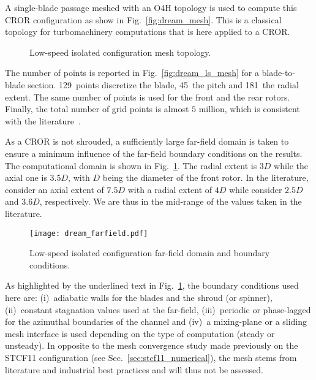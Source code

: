 
A single-blade passage meshed
with an O4H topology is used to compute this
CROR configuration as show in Fig.~\ref{fig:dream_mesh}. This is a classical
topology for turbomachinery computations that is here applied to 
a CROR.
\begin{figure}[htp]
  \centering
  \caption{Low-speed isolated configuration mesh topology.}
\end{figure}
The number of points is reported in 
Fig.~\ref{fig:dream_ls_mesh} for a blade-to-blade section. 
129~points discretize the blade, 45~the pitch and 181~the radial
extent. The same number of points is used for the front
and the rear rotors. 
Finally, the total number of grid points is almost $5$ million, which
is consistent with the literature~\cite{Stuermer2008,Bechet2011,
Francois2013,Zachariadis2011,Peters2012}.

As a CROR is not shrouded, a sufficiently large
far-field domain is taken to ensure a minimum influence
of the far-field boundary conditions on the results.
The computational domain is shown in Fig.~\ref{fig:dream_farfield}.
The radial extent is $3D$ while the axial one is $3.5D$, with
$D$ being the diameter of the front rotor.
In the literature, 
\citet{Peters2012} consider an axial extent of $7.5D$
with a radial extent of $4D$ while \citet{Zachariadis2011}
consider $2.5D$ and $3.6D$, respectively. We are thus in 
the mid-range of the values taken in the literature.
\begin{figure}[htp]
  \centering
  \texttt{[image: dream\_farfield.pdf]}
  \caption{Low-speed isolated configuration far-field domain and boundary conditions.}
  \label{fig:dream_farfield}
\end{figure}
As highlighted by the underlined text in Fig.~\ref{fig:dream_farfield},
the boundary conditions used here are: (i)~adiabatic walls
for the blades and the shroud (or spinner), (ii)~constant
stagnation values used at the far-field, (iii)~periodic
or phase-lagged for the azimuthal boundaries of the channel
and (iv)~a mixing-plane or a sliding mesh interface is
used depending on the type of computation (steady or unsteady).
In opposite to the mesh convergence study made previously on the STCF11
configuration (see Sec.~\ref{sec:stcf11_numerical}),
the mesh stems from literature and industrial best
practices and will thus not be assessed.

